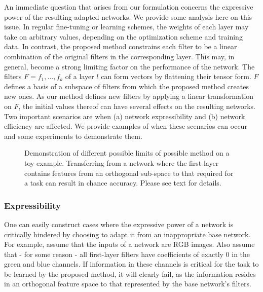 \documentclass[10pt,journal,compsoc]{IEEEtran}
\begin{document}
An immediate question that arises from our formulation concerns the
expressive power of the resulting adapted networks. We provide some
analysis here on this issue. In regular fine-tuning or learning schemes,
the weights of each layer may take on arbitrary values, depending
on the optimization scheme and training data. In contrast, the proposed
method constrains each filter to be a linear combination of the original
filters in the corresponding layer. This may, in general, become a
strong limiting factor on the performance of the network. The filters
$F=f_{1},\dots,f_{k}$ of a layer $l$ can form vectors by flattening
their tensor form. $F$ defines a basis of a subspace of filters from
which the proposed method creates new ones. As our method defines
new filters by applying a linear transformation on $F$, the initial
values thereof can have several effects on the resulting networks.
Two important scenarios are when (a) network expressibility and (b)
network efficiency are affected. We provide examples of when these
scenarios can occur and some experiments to demonstrate them. 
\begin{center}
\begin{figure*}
\begin{centering}
\par\end{centering}
\caption{\label{fig:Demonstration-of-different}Demonstration of different
possible limits of possible method on a toy example. Transferring
from a network where the first layer contains features from an orthogonal
sub-space to that required for a task can result in chance accuracy.
Please see text for details. }
\end{figure*}
\par\end{center}

\subsubsection{Expressibility}

One can easily construct cases where the expressive power of a network
is critically hindered by choosing to adapt it from an inappropriate
base network. For example, assume that the inputs of a network are
RGB images. Also assume that - for some reason - all first-layer filters
have coefficients of exactly 0 in the green and blue channels. If
information in these channels is critical for the task to be learned
by the proposed method, it will clearly fail, as the information resides
in an orthogonal feature space to that represented by the base network's
filters. 
\end{document}
